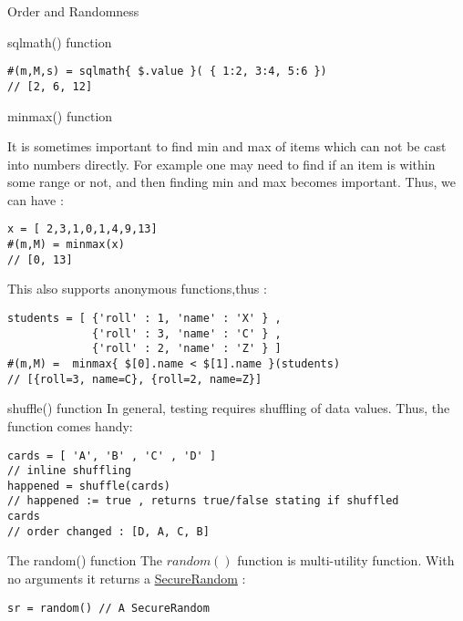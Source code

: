 \begin{section}{Order and Randomness}
\begin{subsection}{sqlmath() function}
\begin{lstlisting}[style=JexlStyle]
#(m,M,s) = sqlmath{ $.value }( { 1:2, 3:4, 5:6 })
// [2, 6, 12]
\end{lstlisting}  

\end{subsection}

\begin{subsection}{minmax() function}

It is sometimes important to find min and max of items which can not be cast into numbers directly. 
For example one may need to find if an item is within some range or not, and then finding min and max becomes important. 
Thus, we can have :

\begin{lstlisting}[style=JexlStyle]
x = [ 2,3,1,0,1,4,9,13]
#(m,M) = minmax(x)
// [0, 13]
\end{lstlisting}  

This also supports anonymous functions,thus :

\begin{lstlisting}[style=JexlStyle]
students = [ {'roll' : 1, 'name' : 'X' } , 
             {'roll' : 3, 'name' : 'C' } , 
             {'roll' : 2, 'name' : 'Z' } ]
#(m,M) =  minmax{ $[0].name < $[1].name }(students)
// [{roll=3, name=C}, {roll=2, name=Z}]
\end{lstlisting}  

\end{subsection}


\begin{subsection}{shuffle() function}
In general, testing requires shuffling of data values. 
Thus, the function comes handy:

\begin{lstlisting}[style=JexlStyle]
cards = [ 'A', 'B' , 'C' , 'D' ] 
// inline shuffling 
happened = shuffle(cards)
// happened := true , returns true/false stating if shuffled
cards
// order changed : [D, A, C, B]
\end{lstlisting}  

\end{subsection}

\begin{subsection}{The random() function}
The $random()$ function is multi-utility function.
With no arguments it returns a 
\href{https://docs.oracle.com/javase/8/docs/api/java/security/SecureRandom.html}{SecureRandom} :

\begin{lstlisting}[style=JexlStyle]
sr = random() // A SecureRandom
\end{lstlisting}  


\end{subsection}
\end{section}
